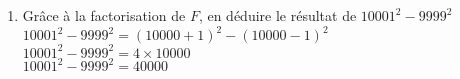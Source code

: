 \begin{corrige}
\begin{enumerate}
\begin{itemize}
       \end{itemize}
       \item Grâce à la factorisation de $F$, en déduire le résultat de $\num{10001}^2-\num{9999}^2$\\
       {\red 
       $\num{10001}^2-\num{9999}^2 = (\num{10000}+1)^2-(\num{10000}-1)^2$\\
       $\num{10001}^2-\num{9999}^2 = 4\times \num{10000}$\\
       $\num{10001}^2-\num{9999}^2 = \num{40000}$\\
       }
    \end{enumerate}
\end{corrige}

